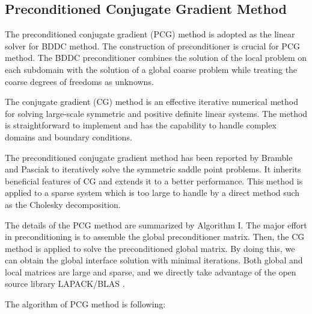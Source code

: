 \subsection{Preconditioned Conjugate Gradient Method}
The preconditioned conjugate gradient (PCG) method is adopted as the linear solver for BDDC method. The construction of preconditioner is crucial for PCG method. The BDDC preconditioner combines the solution of the local problem on each subdomain with the solution of a global coarse problem while treating the coarse degrees of freedoms as unknowns. 


The conjugate gradient (CG) method is an effective iterative numerical method for solving large-scale symmetric and positive definite linear systems. The method is straightforward to implement and has the capability to handle complex domains and boundary conditions. 

The preconditioned conjugate gradient method has been reported by Bramble and Pasciak \cite{bramble1988preconditioning} to iteratively solve the symmetric saddle point problems. It inherits beneficial features of CG  and extends it to a better performance. This method is applied to a sparse system which is too large to handle by a direct method such as the Cholesky decomposition.

The details of the PCG method are summarized by Algorithm I. The major effort in preconditioning is to assemble the global preconditioner matrix. Then, the CG method is applied to solve the preconditioned global matrix. By doing this, we can obtain the global interface solution with minimal iterations. Both global and local matrices are large and sparse, and we directly take advantage of the open source library LAPACK/BLAS \cite{anderson1999lapack}.

The algorithm of PCG method is following:

